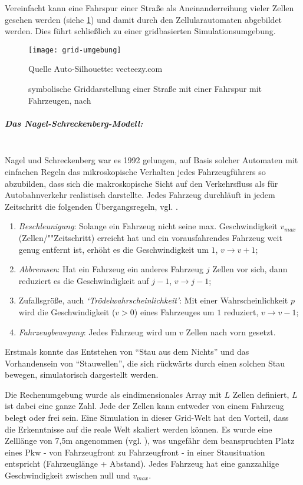 \noindent
Vereinfacht kann eine Fahrspur einer Straße als Aneinanderreihung vieler Zellen gesehen werden (siehe \cref{figure:grid-umgebung}) und damit durch den Zellularautomaten abgebildet werden. 
Dies führt schließlich zu einer gridbasierten Simulationsumgebung. 
\begin{figure}[hptb]
 \centering
 \texttt{[image: grid-umgebung]}
 \caption[Beispiel für die Griddarstellung einer Straße]
 		{symbolische Griddarstellung einer Straße mit einer Fahrspur mit Fahrzeugen, nach \cite{multi-lane}}
        {\footnotesize Quelle Auto-Silhouette: vecteezy.com}
 \label{figure:grid-umgebung}
\end{figure} 


\subparagraph{Das Nagel-Schreckenberg-Modell:}
\label{sec:na-sch}
\hfill \\
Nagel und Schreckenberg war es 1992 gelungen, auf Basis solcher Automaten mit einfachen Regeln das mikroskopische Verhalten jedes Fahr\-zeug\-füh\-rers so abzubilden, dass sich die makroskopische Sicht auf den Verkehrsfluss als für Autobahnverkehr realistisch darstellte. 
Jedes Fahrzeug durchläuft in jedem Zeitschritt die folgenden Übergangsregeln, vgl. \cite{na-sch}. 

\begin{enumerate}
	\item \textit{Beschleunigung}: Solange ein Fahrzeug nicht seine max. Geschwindigkeit $v_{max}$ (Zellen/""Zeitschritt) erreicht hat und ein vorausfahrendes Fahrzeug weit genug entfernt ist, erhöht es die Geschwindigkeit um $1$, $v \rightarrow v+1$;
	\item \textit{Abbremsen}: Hat ein Fahrzeug ein anderes Fahrzeug $j$ Zellen vor sich, dann reduziert es die Geschwindigkeit auf $j-1$, $v \rightarrow j-1$;
	\item Zufallsgröße, auch \textit{\enquote*{Trödelwahrscheinlichkeit}}: Mit einer Wahrscheinlichkeit $p$ wird die Geschwindigkeit ($v > 0$) eines Fahrzeuges um $1$ reduziert, $v \rightarrow v-1$;
	\item \textit{Fahrzeugbewegung}: Jedes Fahrzeug wird um $v$ Zellen nach vorn gesetzt.
\end{enumerate}

Erstmals konnte das Entstehen von \enquote{Stau aus dem Nichts} und das Vorhandensein von \enquote{Stauwellen}, die sich rückwärts durch einen solchen Stau bewegen, simulatorisch dargestellt werden.

Die Rechenumgebung wurde als eindimensionales Array mit $L$ Zellen definiert, $L$ ist dabei eine ganze Zahl. 
Jede der Zellen kann entweder von einem Fahrzeug belegt oder frei sein. 
Eine Simulation in dieser Grid-Welt hat den Vorteil, dass die Erkenntnisse auf die reale Welt skaliert werden können. 
Es wurde eine Zelllänge von 7,5\nolinebreak[4] m angenommen (vgl. \cite[S. 2227]{na-sch}), was ungefähr dem beanspruchten Platz eines Pkw - von Fahrzeugfront zu Fahrzeugfront - in einer Stausituation entspricht (Fahrzeuglänge + Abstand). 
Jedes Fahrzeug hat eine ganzzahlige Geschwindigkeit zwischen null und $v_{max}$.

